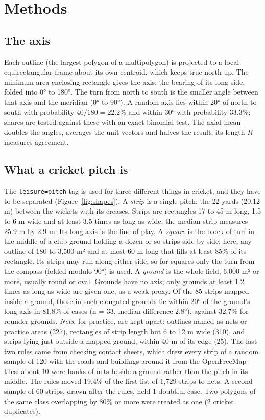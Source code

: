 \documentclass[11pt,a4paper]{article}
\begin{document}
\section{Methods}
\subsection{The axis}
Each outline (the largest polygon of a multipolygon) is projected to a local equirectangular frame about its own centroid, which keeps true north up. The minimum-area enclosing rectangle \citep{freeman} gives the axis: the bearing of its long side, folded into 0° to 180°. The turn from north to south is the smaller angle between that axis and the meridian (0° to 90°). A random axis lies within 20° of north to south with probability $40/180 = 22.2\%$ and within 30° with probability 33.3\%; shares are tested against these with an exact binomial test. The axial mean doubles the angles, averages the unit vectors and halves the result; its length $R$ measures agreement.

\subsection{What a cricket pitch is}
The \texttt{leisure=pitch} tag is used for three different things in cricket, and they have to be separated (Figure~\ref{fig:shapes}).
A \emph{strip} is a single pitch: the 22 yards (20.12 m) between the wickets with its creases. Strips are rectangles 17 to 45 m long, 1.5 to 6 m wide and at least 3.5 times as long as wide; the median strip measures 25.9 m by 2.9 m. Its long axis is the line of play.
A \emph{square} is the block of turf in the middle of a club ground holding a dozen or so strips side by side: here, any outline of 180 to 3,500 m² and at most 60 m long that fills at least 85\% of its rectangle. Its strips may run along either side, so for squares only the turn from the compass (folded modulo 90°) is used.
A \emph{ground} is the whole field, 6,000 m² or more, usually round or oval. Grounds have no axis; only grounds at least 1.2 times as long as wide are given one, as a weak proxy. Of the 85 strips mapped inside a ground, those in such elongated grounds lie within 20° of the ground's long axis in 81.8\% of cases (n = 33, median difference 2.8°), against 32.7\% for rounder grounds.
\emph{Nets}, for practice, are kept apart: outlines named as nets or practice areas (227), rectangles of strip length but 6 to 12 m wide (310), and strips lying just outside a mapped ground, within 40 m of its edge (25). The last two rules came from checking contact sheets, which drew every strip of a random sample of 120 with the roads and buildings around it from the OpenFreeMap tiles: about 10 were banks of nets beside a ground rather than the pitch in its middle. The rules moved 19.4\% of the first list of 1,729 strips to nets. A second sample of 60 strips, drawn after the rules, held 1 doubtful case. Two polygons of the same class overlapping by 80\% or more were treated as one (2 cricket duplicates).
\end{document}
